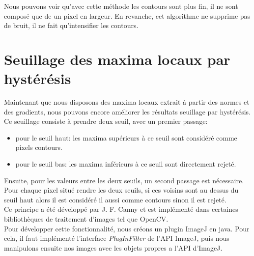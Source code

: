\documentclass[a4paper,11pt]{article}
\begin{document}
  Nous pouvons voir qu'avec cette méthode les contours sont plus fin, il ne sont composé que de un pixel
  en largeur. En revanche, cet algorithme ne supprime pas de bruit, il ne fait qu'intensifier les contours.
  
  \section{Seuillage des maxima locaux par hystérésis}
  
  Maintenant que nous disposons des maxima locaux extrait à partir des normes et des gradients, nous 
  pouvons encore améliorer les résultats seuillage par hystérésis. Ce seuillage consiste à prendre 
  deux seuil, avec un premier passage:
  \begin{itemize}
   \item pour le seuil haut: les maxima supérieurs à ce seuil sont considéré comme pixels contours.
   \item pour le seuil bas: les maxima inférieurs à ce seuil sont directement rejeté.
  \end{itemize}
  
  Ensuite, pour les valeurs entre les deux seuils, un second passage est nécessaire. Pour chaque 
  pixel situé rendre les deux seuils, si ces voisins sont au dessus du seuil haut alors il est 
  considéré il aussi comme contours sinon il est rejeté.\\
  
  Ce principe a été développé par J. F. Canny et est implémenté dans certaines bibliothèques de 
  traitement d'images tel que OpenCV.\\
  
  Pour développer cette fonctionnalité, nous créons un plugin ImageJ en java. Pour cela, il faut 
  implémenté l'interface \textit{PlugInFilter} de l'API ImageJ, puis nous manipulons ensuite nos 
  images avec les objets propres a l'API d'ImageJ.\\
 
\end{document}
